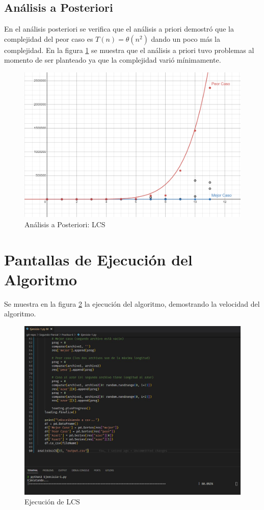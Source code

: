     \subsection{Análisis a Posteriori}
        En el análisis posteriori se verifica que el análisis a priori demostró que la complejidad del peor caso es \(T(n) = \theta(n^{2})\) dando un poco más la complejidad. En la figura \ref{fig:posteriori1} se muestra que el análisis a priori tuvo problemas al momento de ser planteado ya que la complejidad varió mínimamente. 
        \begin{figure}[htp!]
            \centering
            \includegraphics[width=1 \textwidth]{Images/A_Posteriori/posteriori.png}  
            \caption{Análisis a Posteriori: LCS}
            \label{fig:posteriori1}
        \end{figure}
    
    
    
    \newpage
    \section{Pantallas de Ejecución del Algoritmo}
    Se muestra en la figura \ref{fig:terminal} la ejecución del algoritmo, demostrando la velocidad del algoritmo.
    
        \begin{figure}[htp!]
            \centering
            \includegraphics[width=0.8 \textwidth]{Images/Pantallas/ejecucion.jpg}  
            \caption{Ejecución de LCS}
            \label{fig:terminal}
        \end{figure}
    